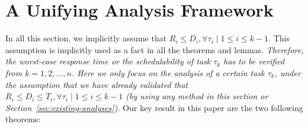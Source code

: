 \section{A Unifying Analysis Framework}
\label{sec:analysis}


 \begin{table*}[t]
    \centering
    \renewcommand{\arraystretch}{1.7}
    \caption{Detailed procedure in Example~\ref{ex:general_framework} for deriving the upper bound of $R_3$, with $R_1-C_1=5$ and $R_2-C_2=9$.}
    \label{tab:example3-calculation}
  \end{table*}


In all this section, we implicitly assume that $R_i
\leq D_i, \forall \tau_i \mid 1 \leq i \leq k-1$.  This assumption is implicitly used as a fact in all the theorems and lemmas. \emph{Therefore, the worst-case response time or the schedulability of task $\tau_k$ has to be verified from $k=1,2,\ldots, n$. Here we only focus on the analysis of a certain task $\tau_k$, under the assumption that we have already validated that $R_i
\leq D_i \leq T_i, \forall \tau_i \mid 1 \leq i \leq k-1$ (by using any method in this section or Section~\ref{sec:existing-analyses}). } 
Our key result in
this paper are the two following theorems:

